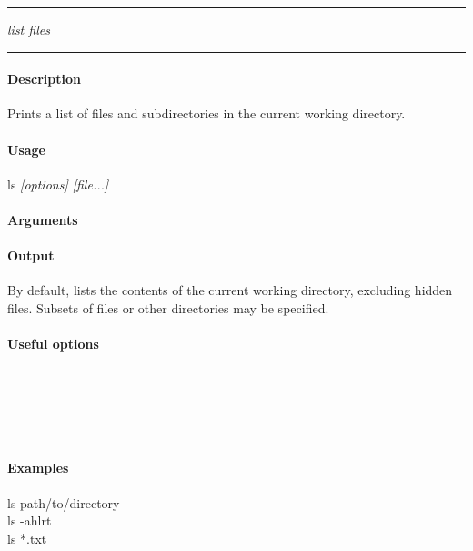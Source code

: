 \hrule
\vspace{1mm}
%
    {\emph{list files}}{}
\hrule
\vspace{4mm}

\paragraph{Description}
\indentpar \raggedright \textrm{Prints a list of files and subdirectories in the current working directory.}\\

\paragraph{Usage}
\indentpar ls \textit{[options] [file...]}

\paragraph{Arguments}
\indentpar {}

\paragraph{Output}
\indentpar \textrm{By default, lists the contents of the current working directory, excluding hidden files. Subsets of files or other directories may be specified.}

\paragraph{Useful options}
\indentpar {}\\
\indentpar {}\\
\indentpar {}\\
\indentpar {}\\
\indentpar {}


\paragraph{Examples}

\indentpar ls path/to/directory \\
\indentpar ls -ahlrt \\
\indentpar ls *.txt

\vspace{20mm}
